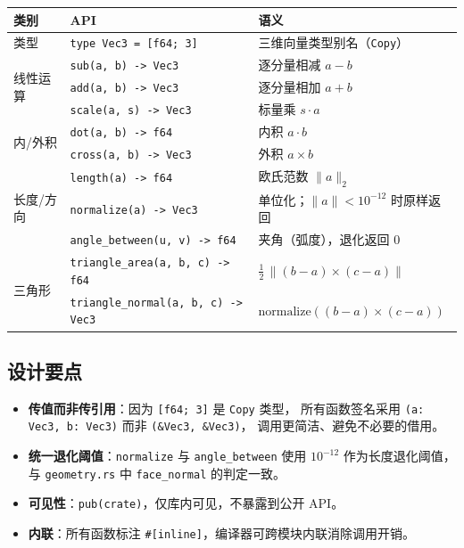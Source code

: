 \documentclass[11pt,a4paper]{article}
\begin{document}
\begin{center}
\renewcommand{\arraystretch}{1.18}
\begin{tabular}{@{}lll@{}}
  \toprule
  \textbf{类别} & \textbf{API} & \textbf{语义} \\
  \midrule
  类型 & \texttt{type Vec3 = [f64; 3]} & 三维向量类型别名（\texttt{Copy}） \\
  \midrule
  \multirow{3}{*}{线性运算}
    & \texttt{sub(a, b) -> Vec3}  & 逐分量相减 $a - b$ \\
    & \texttt{add(a, b) -> Vec3}  & 逐分量相加 $a + b$ \\
    & \texttt{scale(a, s) -> Vec3}& 标量乘 $s \cdot a$ \\
  \midrule
  \multirow{2}{*}{内/外积}
    & \texttt{dot(a, b) -> f64}   & 内积 $a \cdot b$ \\
    & \texttt{cross(a, b) -> Vec3}& 外积 $a \times b$ \\
  \midrule
  \multirow{3}{*}{长度/方向}
    & \texttt{length(a) -> f64}     & 欧氏范数 $\|a\|_2$ \\
    & \texttt{normalize(a) -> Vec3} & 单位化；$\|a\| < 10^{-12}$ 时原样返回 \\
    & \texttt{angle\_between(u, v) -> f64} & 夹角（弧度），退化返回 $0$ \\
  \midrule
  \multirow{2}{*}{三角形}
    & \texttt{triangle\_area(a, b, c) -> f64}   & $\tfrac{1}{2}\,\|(b-a) \times (c-a)\|$ \\
    & \texttt{triangle\_normal(a, b, c) -> Vec3}& $\mathrm{normalize}((b-a) \times (c-a))$ \\
  \bottomrule
\end{tabular}
\end{center}

\subsection{设计要点}

\begin{itemize}
  \item \textbf{传值而非传引用}：因为 \texttt{[f64; 3]} 是 \texttt{Copy} 类型，
        所有函数签名采用 \texttt{(a: Vec3, b: Vec3)} 而非 \texttt{(\&Vec3, \&Vec3)}，
        调用更简洁、避免不必要的借用。
  \item \textbf{统一退化阈值}：\texttt{normalize} 与 \texttt{angle\_between}
        使用 $10^{-12}$ 作为长度退化阈值，与 \texttt{geometry.rs} 中
        \texttt{face\_normal} 的判定一致。
  \item \textbf{可见性}：\texttt{pub(crate)}，仅库内可见，不暴露到公开 API。
  \item \textbf{内联}：所有函数标注 \texttt{\#[inline]}，编译器可跨模块内联消除调用开销。
\end{itemize}
\end{document}
